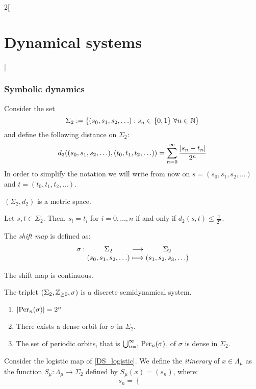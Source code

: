 \documentclass[../../../main_math.tex]{subfiles}
\begin{document}
\begin{multicols}{2}[\section{Dynamical systems}]
  \subsubsection{Symbolic dynamics}
  \begin{definition}
    Consider the set $$\Sigma_2:=\{(s_0,s_1,s_2,\ldots):s_n\in\{0,1\}\ \forall n\in\NN\}$$ and define the following distance on $\Sigma_2$: $$d_2((s_0,s_1,s_2,\ldots),(t_0,t_1,t_2,\ldots))=\sum_{n=0}^\infty \frac{\abs{s_n-t_n}}{2^n}$$
    In order to simplify the notation we will write from now on $s=(s_0,s_1,s_2,\ldots)$ and $t=(t_0,t_1,t_2,\ldots)$.
  \end{definition}
  \begin{lemma}
    $(\Sigma_2,d_2)$ is a metric space.
  \end{lemma}
  \begin{proposition}
    Let $s, t\in\Sigma_2$. Then, $s_i=t_i$ for $i=0,\ldots,n$ if and only if $d_2(s,t)\leq \frac{1}{2^n}$.
  \end{proposition}
  \begin{definition}
    The \emph{shift map} is defined as:
    $$\function{\sigma}{\Sigma_2}{\Sigma_2}{(s_0,s_1,s_2,\ldots)}{(s_1,s_2,s_3,\ldots)}$$
  \end{definition}
  \begin{proposition}
    The shift map is continuous.
  \end{proposition}
  \begin{proposition}
    The triplet $(\Sigma_2, \ZZ_{\geq 0}, \sigma)$ is a discrete semidynamical system.
  \end{proposition}
  \begin{proposition}\hfill
    \begin{enumerate}
      \item $\abs{\Per_n(\sigma)}=2^n$
      \item There exists a dense orbit for $\sigma$ in $\Sigma_2$.
      \item The set of periodic orbits, that is $\bigcup_{n=1}^\infty \Per_n(\sigma)$, of $\sigma$ is dense in $\Sigma_2$.
    \end{enumerate}
  \end{proposition}
  \begin{definition}
    Consider the logistic map of \cref{DS_logistic}. We define the \emph{itinerary} of $x\in\Lambda_\mu$ as the function $S_\mu:\Lambda_\mu\rightarrow\Sigma_2$ defined by $S_\mu(x)=(s_n)$, where:
    $$s_n=
      \begin{cases}

\end{cases}$$
\end{definition}
\end{multicols}
\end{document}

